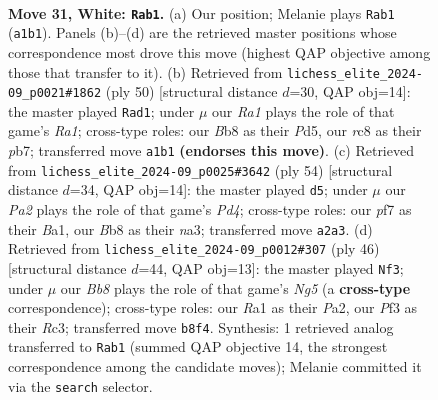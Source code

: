 \documentclass[11pt]{article}
\begin{document}
\clearpage

\begin{figure}[p]\centering
\begin{subfigure}{0.46\textwidth}\centering
\resizebox{\linewidth}{!}{%
\newchessgame
\chessboard[
  setfen={1Br5/1p3pk1/p3p3/8/7p/4PP2/Pb4PP/R3R1K1 w - - 0 31},
  showmover=false,
  pgfstyle=straightmove, color=movearrow, markmove={a1-b1}
]}
\caption{}
\end{subfigure}\hfill
\begin{subfigure}{0.46\textwidth}\centering
\resizebox{\linewidth}{!}{%
\newchessgame
\chessboard[
  setfen={r5k1/1p5p/3p2p1/p2P4/3b4/1P3PP1/P6P/R4R1K w - - 0 26},
  showmover=false,
  pgfstyle=straightmove, color=movearrow, markmove={a1-d1}
]}
\caption{}
\end{subfigure}
\\[4pt]
\begin{subfigure}{0.46\textwidth}\centering
\resizebox{\linewidth}{!}{%
\newchessgame
\chessboard[
  setfen={3r4/6pp/1k2p3/1p6/1b1PP3/n4PP1/R3R1KP/B7 w - - 0 28},
  showmover=false,
  pgfstyle=straightmove, color=movearrow, markmove={d4-d5}
]}
\caption{}
\end{subfigure}\hfill
\begin{subfigure}{0.46\textwidth}\centering
\resizebox{\linewidth}{!}{%
\newchessgame
\chessboard[
  setfen={4r1k1/p1p5/1p3pp1/5bN1/3r4/2R4P/P4PP1/2R3K1 w - - 0 24},
  showmover=false,
  pgfstyle=straightmove, color=movearrow, markmove={g5-f3}
]}
\caption{}
\end{subfigure}
\caption{\textbf{Move 31, White: \texttt{Rab1}.} (a) Our position; Melanie plays \texttt{Rab1} (\texttt{a1b1}). Panels (b)--(d) are the retrieved master positions whose correspondence most drove this move (highest QAP objective among those that transfer to it). (b) Retrieved from \texttt{lichess\_elite\_2024-09\_p0021\#1862} (ply 50) [structural distance $d$=30, QAP obj=14]: the master played \texttt{Rad1}; under $\mu$ our \emph{Ra1} plays the role of that game's \emph{Ra1}; cross-type roles: our \emph{B}b8 as their \emph{P}d5, our \emph{r}c8 as their \emph{p}b7; transferred move \texttt{a1b1} \textbf{(endorses this move)}. (c) Retrieved from \texttt{lichess\_elite\_2024-09\_p0025\#3642} (ply 54) [structural distance $d$=34, QAP obj=14]: the master played \texttt{d5}; under $\mu$ our \emph{Pa2} plays the role of that game's \emph{Pd4}; cross-type roles: our \emph{p}f7 as their \emph{B}a1, our \emph{B}b8 as their \emph{n}a3; transferred move \texttt{a2a3}. (d) Retrieved from \texttt{lichess\_elite\_2024-09\_p0012\#307} (ply 46) [structural distance $d$=44, QAP obj=13]: the master played \texttt{Nf3}; under $\mu$ our \emph{Bb8} plays the role of that game's \emph{Ng5} (a \textbf{cross-type} correspondence); cross-type roles: our \emph{R}a1 as their \emph{P}a2, our \emph{P}f3 as their \emph{R}c3; transferred move \texttt{b8f4}. Synthesis: 1 retrieved analog transferred to \texttt{Rab1} (summed QAP objective 14, the strongest correspondence among the candidate moves); Melanie committed it via the \texttt{search} selector.}
\label{fig:thought-m60}
\end{figure}
\end{document}
